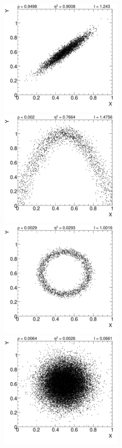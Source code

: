 \begin{itemize}
\begin{figure}[t]
\begin{center}
  \includegraphics[width=6.2cm]{plots/linDep} \hspace{0.3cm}
  \includegraphics[width=6.2cm]{plots/funcDep} \\\vspace{+0.2cm}
  \includegraphics[width=6.2cm]{plots/nonFuncDep} \hspace{0.3cm}
  \includegraphics[width=6.2cm]{plots/noDep} 

\end{center}
\end{figure}
\end{itemize}

